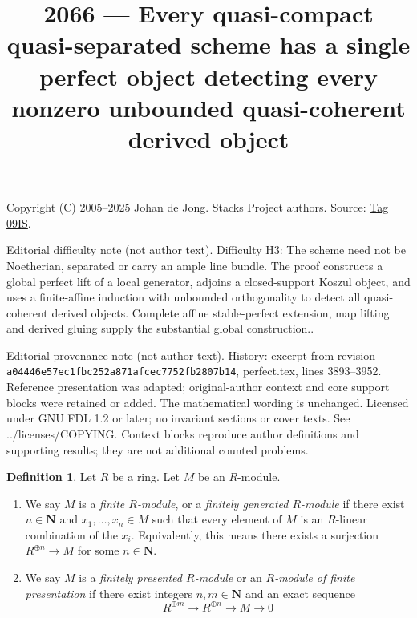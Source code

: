 \documentclass{amsart}
\theoremstyle{plain}
\theoremstyle{definition}
\newtheorem{definition}[subsection]{Definition}
\theoremstyle{remark}
\numberwithin{equation}{subsection}
\begin{document}
\title[Stacks Project, Tag 09IS]{2066 --- Every quasi-compact quasi-separated scheme has a single perfect object detecting every nonzero unbounded quasi-coherent derived object}
\maketitle
\noindent Copyright (C) 2005--2025 Johan de Jong. Stacks Project authors. Source: \href{https://stacks.math.columbia.edu/tag/09IS}{Tag 09IS}.

\noindent Editorial difficulty note (not author text). Difficulty H3: The scheme need not be Noetherian, separated or carry an ample line bundle. The proof constructs a global perfect lift of a local generator, adjoins a closed-support Koszul object, and uses a finite-affine induction with unbounded orthogonality to detect all quasi-coherent derived objects. Complete affine stable-perfect extension, map lifting and derived gluing supply the substantial global construction..

\noindent Editorial provenance note (not author text). History: excerpt from revision \texttt{a0444\allowbreak 6e57e\allowbreak c1fbc\allowbreak 252a8\allowbreak 71afc\allowbreak ec775\allowbreak 2fb28\allowbreak 07b14}, perfect.tex, lines 3893--3952. Reference presentation was adapted; original-author context and core support blocks were retained or added. The mathematical wording is unchanged. Licensed under GNU FDL 1.2 or later; no invariant sections or cover texts. See ../licenses/COPYING. Context blocks reproduce author definitions and supporting results; they are not additional counted problems.

\begin{definition}
\label{algebra-definition-module-finite-type}
Let $R$ be a ring. Let $M$ be an $R$-module.
\begin{enumerate}
\item We say $M$ is a {\it finite $R$-module}, or a {\it finitely generated
$R$-module} if there exist $n \in \mathbf{N}$ and $x_1, \ldots, x_n \in M$
such that every element of $M$ is an $R$-linear combination of the $x_i$.
Equivalently, this means there exists a surjection
$R^{\oplus n} \to M$ for some $n \in \mathbf{N}$.
\item We say $M$ is a {\it finitely presented $R$-module} or an
{\it $R$-module of finite presentation} if there exist integers
$n, m \in \mathbf{N}$ and an exact sequence
$$
R^{\oplus m} \longrightarrow R^{\oplus n} \longrightarrow M \longrightarrow 0
$$
\end{enumerate}
\end{definition}
\end{document}
